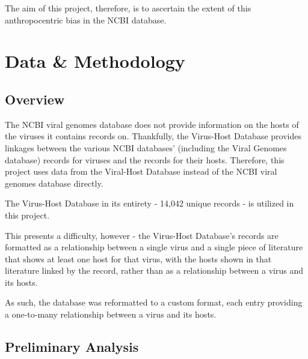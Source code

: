 \documentclass[12pt]{article}
\begin{document}
    The aim of this project, therefore, is to ascertain the extent of this
    anthropocentric bias in the NCBI database.

    \section{Data \& Methodology}
    
    \subsection{Overview}

    The NCBI viral genomes database does not provide information on the hosts
    of the viruses it contains records on. Thankfully, the Virus-Host Database provides
    linkages between the various NCBI databases' (including the Viral Genomes
    database) records for viruses and the records for their hosts. Therefore,
    this project uses data from the Viral-Host Database instead of the NCBI viral
    genomes database directly.

    The Virus-Host Database in its entirety - 14,042 unique records - is utilized in
    this project.

    This presents a difficulty, however - the Virus-Host Database's records are
    formatted as a relationship between a single virus and a single piece of
    literature that shows at least one host for that virus, with the hosts shown
    in that literature linked by the record, rather than as a relationship between a
    virus and its hosts.

    As such, the database was reformatted to a custom format, each entry providing
    a one-to-many relationship between a virus and its hosts.

    \subsection{Preliminary Analysis}
\end{document}
